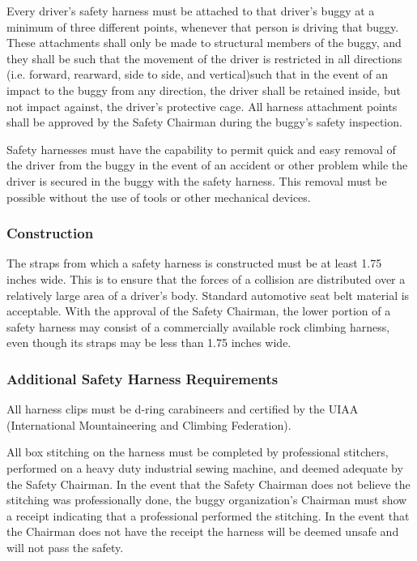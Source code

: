	Every driver's safety harness must be attached to that driver's buggy at a minimum of three different points, whenever that person is driving that buggy. These attachments shall only be made to structural members of the buggy, and they shall be such that the movement of the driver is restricted in all directions (i.e. forward, rearward, side to side, and vertical)such that in the event of an impact to the buggy from any direction, the driver shall be retained inside, but not impact against, the driver's protective cage. All harness attachment points shall be approved by the Safety Chairman during the buggy's safety inspection.
	
	Safety harnesses must have the capability to permit quick and easy removal of the driver from the buggy in the event of an accident or other problem while the driver is secured in the buggy with the safety harness. This removal must be possible without the use of tools or other mechanical devices.

\subsubsection{Construction}

	The straps from which a safety harness is constructed must be at least 1.75 inches wide. This is to ensure that the forces of a collision are distributed over a relatively large area of a driver's body. Standard automotive seat belt material is acceptable. With the approval of the Safety Chairman, the lower portion of a safety harness may consist of a commercially available rock climbing harness, even though its straps may be less than 1.75 inches wide.

\subsubsection{Additional Safety Harness Requirements}

	All harness clips must be d-ring carabineers and certified by the UIAA (International Mountaineering and Climbing Federation).
	
	All box stitching on the harness must be completed by professional stitchers, performed on a heavy duty industrial sewing machine, and deemed adequate by the Safety Chairman. In the event that the Safety Chairman does not believe the stitching was professionally done, the buggy organization's Chairman must show a receipt indicating that a professional performed the stitching. In the event that the Chairman does not have the receipt the harness will be deemed unsafe and will not pass the safety. 
	
